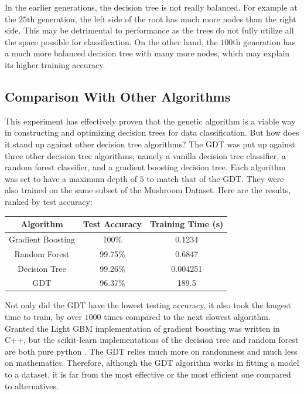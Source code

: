 \documentclass[12pt]{article}
\begin{document}
In the earlier generations, the decision tree is not really balanced. For example at the $25$th generation, the left side of the root has much more nodes than the right side. This may be detrimental to performance as the trees do not fully utilize all the space possible for classification. On the other hand, the $100$th generation has a much more balanced decision tree with many more nodes, which may explain its higher training accuracy.

\subsection{Comparison With Other Algorithms}

This experiment has effectively proven that the genetic algorithm is a viable way in constructing and optimizing decision trees for data classification. But how does it stand up against other decision tree algorithms? The GDT was put up against three other decision tree algorithms, namely a vanilla decision tree classifier, a random forest classifier, and a gradient boosting decision tree. Each algorithm was set to have a maximum depth of $5$ to match that of the GDT. They were also trained on the same subset of the Mushroom Dataset. Here are the results, ranked by test accuracy:

\begin{center}
    \begin{tabular}{|c|c|c|}
        \hline
        Algorithm & Test Accuracy & Training Time (s) \\
        \hline \hline
        Gradient Boosting & 100\% & 0.1234 \\
        \hline
        Random Forest & 99.75\% & 0.6847 \\
        \hline
        Decision Tree & 99.26\% & 0.004251 \\
        \hline
        GDT & 96.37\% & 189.5 \\
        \hline
    \end{tabular}
\end{center}

Not only did the GDT have the lowest testing accuracy, it also took the longest time to train, by over $1000$ times compared to the next slowest algorithm. Granted the Light GBM \cite{ke2017lightgbm} implementation of gradient boosting was written in C++, but the scikit-learn implementations of the decision tree and random forest are both pure python \cite{scikit-learn}. The GDT relies much more on randomness and much less on mathematics. Therefore, although the GDT algorithm works in fitting a model to a dataset, it is far from the most effective or the most efficient one compared to alternatives.
\end{document}
